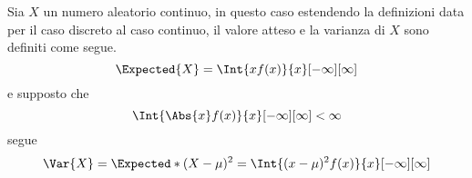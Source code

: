 \documentclass{subfiles}
\begin{document}
Sia $X$ un numero aleatorio continuo, in questo caso estendendo la definizioni data per il caso discreto al caso continuo,
il valore atteso e la varianza di $X$ sono definiti come segue.
$$
    \Expected{X} = \Int{x f(x)}{x}[-\infty][\infty]
$$
e supposto che
$$
    \Int{\Abs{x} f(x)}{x}[-\infty][\infty] < \infty
$$
segue
$$
    \Var{X} = \Expected*{(X - \mu)^{2}} = \Int{(x - \mu)^{2} f(x)}{x}[-\infty][\infty]
$$
\end{document}
